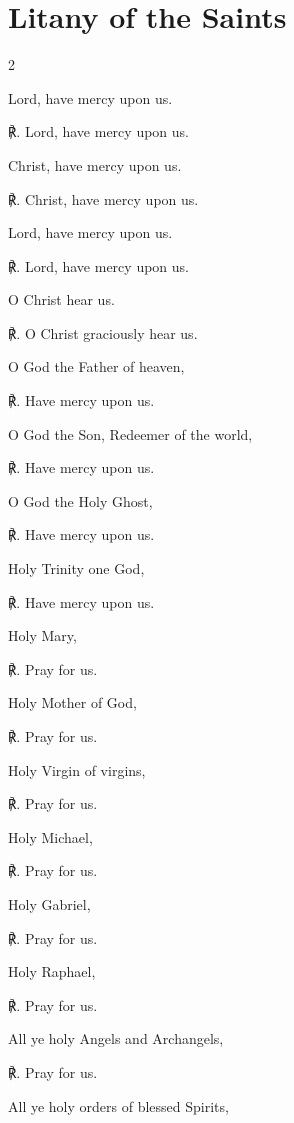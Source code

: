 \section{Litany of the Saints}\label{LitanySaints}
\fancyhead[RE,LO]{}

\begin{multicols}{2}
\par\noindent
Lord, have mercy upon us.\par
℟. Lord, have mercy upon us.\par\noindent
Christ, have mercy upon us.\par
℟. Christ, have mercy upon us.\par\noindent
Lord, have mercy upon us.\par
℟. Lord, have mercy upon us.\par\noindent
O Christ hear us.\par
℟. O Christ graciously hear us.\par\noindent
O God the Father of heaven,\par
℟. Have mercy upon us.\par\noindent
O God the Son, Redeemer of the world,\par
℟. Have mercy upon us.\par\noindent
O God the Holy Ghost,\par
℟. Have mercy upon us.\par\noindent
Holy Trinity one God,\par
℟. Have mercy upon us.\par\noindent
Holy Mary,\par
℟. Pray for us.\par\noindent
Holy Mother of God,\par
℟. Pray for us.\par\noindent
Holy Virgin of virgins,\par
℟. Pray for us.\par\noindent
Holy Michael,\par
℟. Pray for us.\par\noindent
Holy Gabriel,\par
℟. Pray for us.\par\noindent
Holy Raphael,\par
℟. Pray for us.\par\noindent
All ye holy Angels and Archangels,\par
℟. Pray for us.\par\noindent
All ye holy orders of blessed Spirits,\par

\end{multicols}
